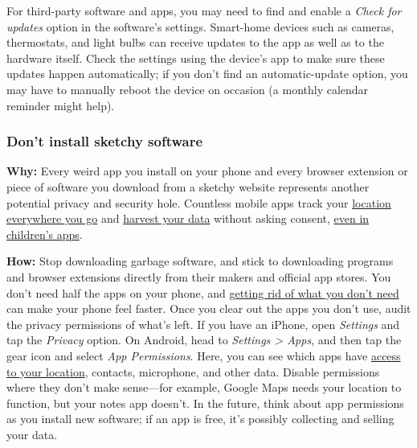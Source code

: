For third-party software and apps, you may need to find and enable a
\emph{Check for updates} option in the software's settings. Smart-home
devices such as cameras, thermostats, and light bulbs can receive
updates to the app as well as to the hardware itself. Check the settings
using the device's app to make sure these updates happen automatically;
if you don't find an automatic-update option, you may have to manually
reboot the device on occasion (a monthly calendar reminder might help).

\hypertarget{dont-install-sketchy-software}{%
\subsubsection{Don't install sketchy
software}\label{dont-install-sketchy-software}}

\textbf{Why:} Every weird app you install on your phone and every
browser extension or piece of software you download from a sketchy
website represents another potential privacy and security hole.
Countless mobile apps track your
\href{https://www.nytimes3xbfgragh.onion/interactive/2018/12/10/business/location-data-privacy-apps.html}{location
everywhere you go} and
\href{https://www.nytimes3xbfgragh.onion/2018/05/19/technology/phone-apps-stalking.html}{harvest
your data} without asking consent,
\href{https://www.nytimes3xbfgragh.onion/interactive/2018/09/12/technology/kids-apps-data-privacy-google-twitter.html}{even
in children's apps}.~

\textbf{How:} Stop downloading garbage software, and stick to
downloading programs and browser extensions directly from their makers
and official app stores. You don't need half the apps on your phone, and
\href{https://www.nytimes3xbfgragh.onion/2019/04/18/smarter-living/wirecutter/declutter-speed-up-phone.html}{getting
rid of what you don't need} can make your phone feel faster. Once you
clear out the apps you don't use, audit the privacy permissions of
what's left. If you have an iPhone, open \emph{Settings} and tap the
\emph{Privacy} option. On Android, head to \emph{Settings \textgreater{}
Apps}, and then tap the gear icon and select \emph{App Permissions}.
Here, you can see which apps have
\href{https://www.nytimes3xbfgragh.onion/2018/12/10/technology/prevent-location-data-sharing.html}{access
to your location}, contacts, microphone, and other data. Disable
permissions where they don't make sense---for example, Google Maps needs
your location to function, but your notes app doesn't. In the future,
think about app permissions as you install new software; if an app is
free, it's possibly collecting and selling your data.


